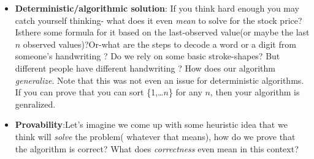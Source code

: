 \documentclass[]{article}
\begin{document}
	\begin{itemize}
		\item \textbf{Deterministic/algorithmic solution}: If you think hard enough you may catch yourself thinking- what does it even \textit{mean} to solve for the stock price?Isthere some formula for it based on the last-observed value(or maybe the last $n$ observed values)?Or-what are the steps to decode a word or a digit from someone's handwriting ? Do we rely on some basic stroke-shapes? But different people have different handwriting ? How does our algorithm \textit{generalize}. Note that this was not even an issue for deterministic algorithms. If you can prove that you can sort \{1,\ldots $n$\} for any $n$, then your algorithm is genralized. 
		\item \textbf{Provability}:Let's imagine we come up with some heuristic idea that we think will \textit{solve} the problem( whatever that means), how do we prove that the algorithm is correct? What does \textit{correctness} even mean in this context?
		

\end{itemize}
\end{document}
